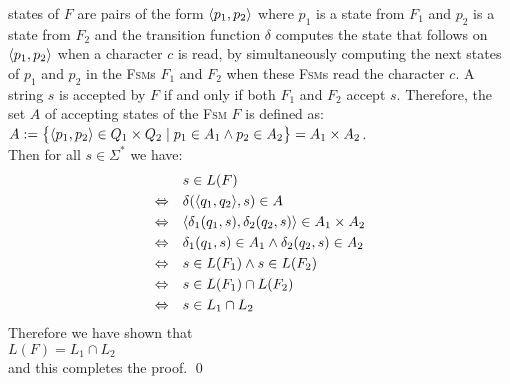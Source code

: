 states of $F$ are pairs of the form $\pair(p_1,p_2)$ where $p_1$ is a state from $F_1$ and $p_2$ is a state from
$F_2$ and the transition function $\delta$ computes the state that follows on
$\pair(p_1,p_2)$ when a character $c$ is read, by simultaneously computing the next states of $p_1$ and $p_2$
in the \textsc{Fsm}s $F_1$ and $F_2$ when these \textsc{Fsm}s read the character $c$. 
A string $s$ is accepted by $F$ if and only if
both $F_1$ and  $F_2$ accept $s$.  Therefore, the set $A$ of accepting states of the \textsc{Fsm} $F$ is defined as:
\\[0.2cm]
\hspace*{1.3cm}
$A := \bigl\{ \pair(p_1,p_2) \in Q_1 \times Q_2 \mid p_1 \in A_1 \wedge p_2 \in A_2 \bigr\} = A_1 \times A_2$.
\\[0.2cm]
Then for all $s \in \Sigma^*$ we have:
$$
\begin{array}[t]{cl}
                & s \in L(F)                                                           \\[0.1cm]
\Leftrightarrow & \delta(\pair(q_1,q_2), s) \in A                                      \\[0.1cm]
\Leftrightarrow & \langle \delta_1(q_1,s), \delta_2(q_2, s) \rangle \in A_1 \times A_2 \\[0.1cm]
\Leftrightarrow & \delta_1(q_1,s) \in A_1 \wedge  \delta_2(q_2, s) \in A_2             \\[0.1cm]
\Leftrightarrow & s \in L(F_1) \wedge  s \in L(F_2)                                    \\[0.1cm]
\Leftrightarrow & s \in L(F_1) \cap L(F_2)                                             \\[0.1cm]
\Leftrightarrow & s \in L_1 \cap L_2                                                 
\end{array}
$$
Therefore we have shown that
\\[0.2cm]
\hspace*{1.3cm}
 $L(F) = L_1 \cap L_2$ 
\\[0.2cm]
and this completes the proof. \qed

